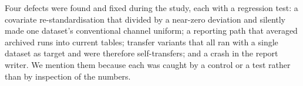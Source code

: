 Four defects were found and fixed during the study, each with a regression test: a covariate
re-standardisation that divided by a near-zero deviation and silently made one dataset's
conventional channel uniform; a reporting path that averaged archived runs into current tables;
transfer variants that all ran with a single dataset as target and were therefore self-transfers;
and a crash in the report writer. We mention them because each was caught by a control or a test
rather than by inspection of the numbers.
